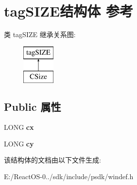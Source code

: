 \hypertarget{structtag_s_i_z_e}{}\section{tag\+S\+I\+Z\+E结构体 参考}
\label{structtag_s_i_z_e}
类 tag\+S\+I\+ZE 继承关系图\+:\begin{figure}[H]
\begin{center}
\leavevmode
\includegraphics[height=2.000000cm]{structtag_s_i_z_e}
\end{center}
\end{figure}
\subsection*{Public 属性}
\begin{DoxyCompactItemize}
\item 
\mbox{\label{structtag_s_i_z_e_a20b671f4cb106da17b922d4e0a2fa676}} 
L\+O\+NG {\bfseries cx}
\item 
\mbox{\label{structtag_s_i_z_e_a35a6c23eb61af8168060b10b13ff1d40}} 
L\+O\+NG {\bfseries cy}
\end{DoxyCompactItemize}


该结构体的文档由以下文件生成\+:\begin{DoxyCompactItemize}
\item 
E\+:/\+React\+O\+S-\/0../sdk/include/psdk/windef.\+h\end{DoxyCompactItemize}
